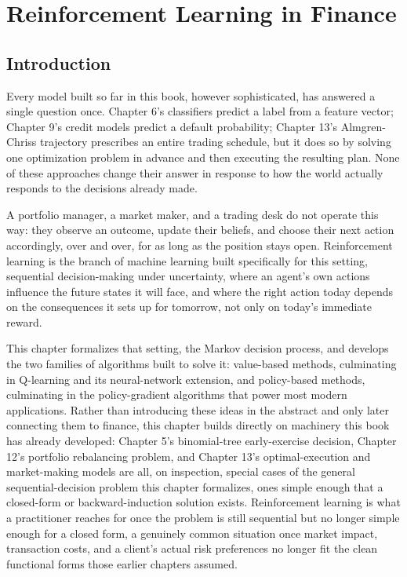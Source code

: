 \documentclass[../ai_in_finance]{subfiles}
\begin{document}
\chapter{Reinforcement Learning in Finance}

\section{Introduction}

Every model built so far in this book, however sophisticated, has answered a single question once. Chapter 6's classifiers predict
a label from a feature vector; Chapter 9's credit models predict a default probability; Chapter 13's
Almgren-Chriss trajectory prescribes an entire trading schedule, but it does so by solving one
 optimization problem in advance and then executing the resulting plan. None of these approaches change their answer in
 response to how the world actually responds to the decisions already made.

A portfolio manager, a market maker, and a trading desk do not operate this way: they observe an outcome, update their beliefs,
and choose their next action accordingly, over and over, for as long as the position stays open. Reinforcement
learning is the branch of machine learning built specifically for this setting,
sequential decision-making under uncertainty, where an agent's own actions influence the future states it will face,
and where the right action today depends on the consequences it sets up for tomorrow, not only on today's immediate reward.

This chapter formalizes that setting, the Markov decision process, and develops the two families of algorithms built to solve it: value-based methods, culminating in Q-learning and its neural-network extension, and policy-based methods, culminating in the policy-gradient algorithms that power most modern applications. Rather than introducing these ideas in the abstract and only later connecting them to finance, this chapter builds directly on machinery this book has already developed: Chapter 5's binomial-tree early-exercise decision, Chapter 12's portfolio rebalancing problem, and Chapter 13's optimal-execution and market-making models are all, on inspection, special cases of the general sequential-decision problem this chapter formalizes, ones simple enough that a closed-form or backward-induction solution exists. Reinforcement learning is what a practitioner reaches for once the problem is still sequential but no longer simple enough for a closed form, a genuinely common situation once market impact, transaction costs, and a client's actual risk preferences no longer fit the clean functional forms those earlier chapters assumed.
\end{document}
